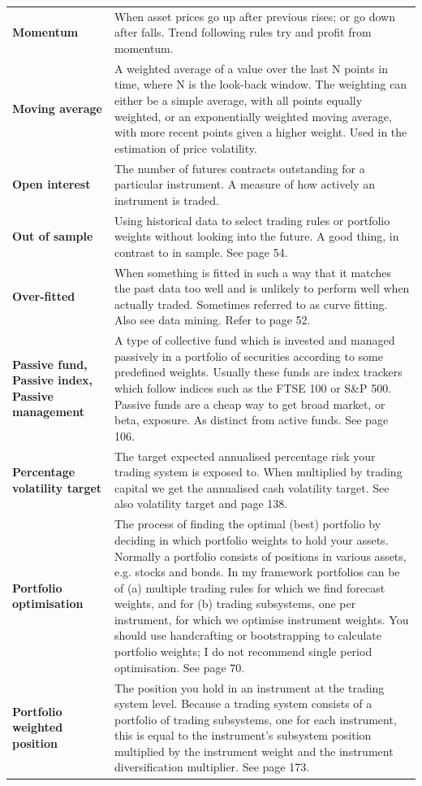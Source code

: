 {\begin{longtable}{@{}>{\raggedright\arraybackslash\bfseries} p{}>{\raggedright\arraybackslash} p{}@{}}
Momentum & When asset prices go up after previous rises; or go down after falls. Trend following rules try and profit from momentum. \\[0.65em]
Moving average & A weighted average of a value over the last N points in time, where N is the look-back window. The weighting can either be a simple average, with all points equally weighted, or an exponentially weighted moving average, with more recent points given a higher weight. Used in the estimation of price volatility. \\[0.65em]
Open interest & The number of futures contracts outstanding for a particular instrument. A measure of how actively an instrument is traded. \\[0.65em]
Out of sample & Using historical data to select trading rules or portfolio weights without looking into the future. A good thing, in contrast to in sample. See page 54. \\[0.65em]
Over-fitted & When something is fitted in such a way that it matches the past data too well and is unlikely to perform well when actually traded. Sometimes referred to as curve fitting. Also see data mining. Refer to page 52. \\[0.65em]
Passive fund, Passive index, Passive management & A type of collective fund which is invested and managed passively in a portfolio of securities according to some predefined weights. Usually these funds are index trackers which follow indices such as the FTSE 100 or S\&P 500. Passive funds are a cheap way to get broad market, or beta, exposure. As distinct from active funds. See page 106. \\[0.65em]
Percentage volatility target & The target expected annualised percentage risk your trading system is exposed to. When multiplied by trading capital we get the annualised cash volatility target. See also volatility target and page 138. \\[0.65em]
Portfolio optimisation & The process of finding the optimal (best) portfolio by deciding in which portfolio weights to hold your assets. Normally a portfolio consists of positions in various assets, e.g. stocks and bonds. In my framework portfolios can be of (a) multiple trading rules for which we find forecast weights, and for (b) trading subsystems, one per instrument, for which we optimise instrument weights. You should use handcrafting or bootstrapping to calculate portfolio weights; I do not recommend single period optimisation. See page 70. \\[0.65em]
Portfolio weighted position & The position you hold in an instrument at the trading system level. Because a trading system consists of a portfolio of trading subsystems, one for each instrument, this is equal to the instrument’s subsystem position multiplied by the instrument weight and the instrument diversification multiplier. See page 173. \\[0.65em]

\end{longtable}}

